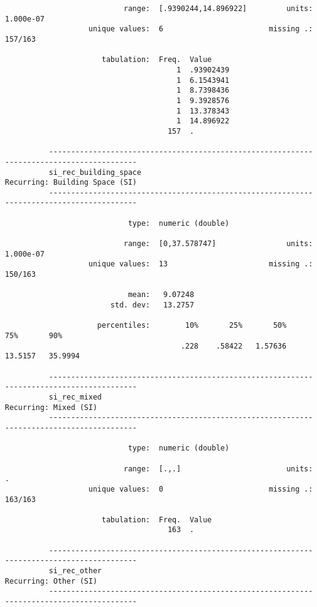 \documentclass{article}
\begin{document}
\begin{verbatim}
                           range:  [.9390244,14.896922]         units:  1.000e-07
                   unique values:  6                        missing .:  157/163
          
                      tabulation:  Freq.  Value
                                       1  .93902439
                                       1  6.1543941
                                       1  8.7398436
                                       1  9.3928576
                                       1  13.378343
                                       1  14.896922
                                     157  .
          
          ------------------------------------------------------------------------------------------
          si_rec_building_space                                       Recurring: Building Space (SI)
          ------------------------------------------------------------------------------------------
          
                            type:  numeric (double)
          
                           range:  [0,37.578747]                units:  1.000e-07
                   unique values:  13                       missing .:  150/163
          
                            mean:   9.07248
                        std. dev:   13.2757
          
                     percentiles:        10%       25%       50%       75%       90%
                                        .228    .58422   1.57636   13.5157   35.9994
          
          ------------------------------------------------------------------------------------------
          si_rec_mixed                                                         Recurring: Mixed (SI)
          ------------------------------------------------------------------------------------------
          
                            type:  numeric (double)
          
                           range:  [.,.]                        units:  .
                   unique values:  0                        missing .:  163/163
          
                      tabulation:  Freq.  Value
                                     163  .
          
          ------------------------------------------------------------------------------------------
          si_rec_other                                                         Recurring: Other (SI)
          ------------------------------------------------------------------------------------------
          

\end{verbatim}
\end{document}
